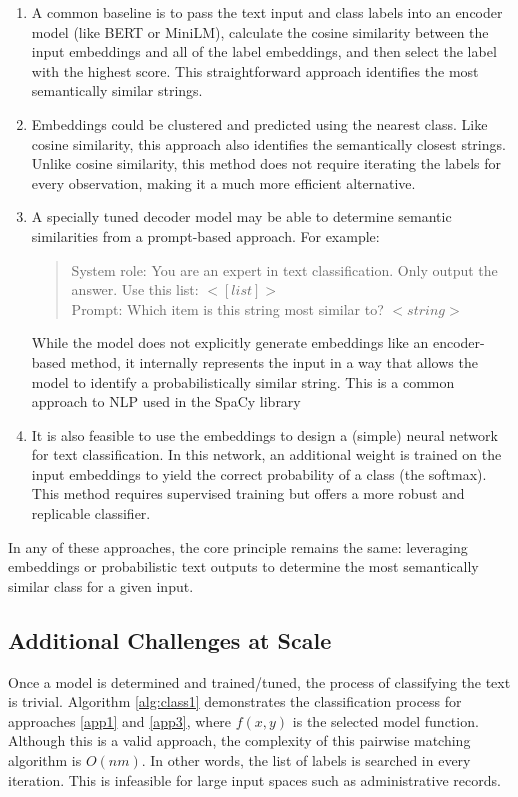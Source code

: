 \documentclass[12pt]{article}
\begin{document}
\begin{enumerate}
    \item A common baseline is to pass the text input and class labels into an encoder model (like BERT or MiniLM), calculate the cosine similarity between the input embeddings and all of the label embeddings, and then select the label with the highest score. This straightforward approach identifies the most semantically similar strings. \label{app1}

    \item Embeddings could be clustered and predicted using the nearest class. Like cosine similarity, this approach also identifies the semantically closest strings. Unlike cosine similarity, this method does not require iterating the labels for every observation, making it a much more efficient alternative. \label{app2}
    
    \item  A specially tuned decoder model may be able to determine semantic similarities from a prompt-based approach. For example:
\begin{quote}
    System role: You are an expert in text classification. Only output the answer. Use this list: $<[list]>$\\
    Prompt: Which item is this string most similar to? $<string>$
\end{quote}
While the model does not explicitly generate embeddings like an encoder-based method, it internally represents the input in a way that allows the model to identify a probabilistically similar string. This is a common approach to NLP used in the SpaCy library \cite{spacy}

\item  It is also feasible to use the embeddings to design a (simple) neural network for text classification. In this network, an additional weight is trained on the input embeddings to yield the correct probability of a class (the softmax). This method requires supervised training but offers a more robust and replicable classifier. \label{app4}

\end{enumerate}

In any of these approaches, the core principle remains the same: leveraging embeddings or probabilistic text outputs to determine the most semantically similar class for a given input.


\subsection{Additional Challenges at Scale}\label{sec:ANN}
Once a model is determined and trained/tuned, the process of classifying the text is trivial. Algorithm \ref{alg:class1} demonstrates the classification process for approaches \ref{app1} and \ref{app3}, where $f(x,y)$ is the selected model function. Although this is a valid approach, the complexity of this pairwise matching algorithm is $O(nm)$. In other words, the list of labels is searched in every iteration. This is infeasible for large input spaces such as administrative records.
\end{document}
